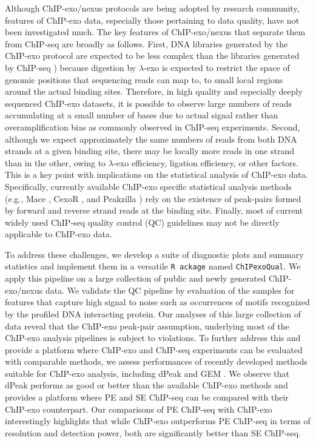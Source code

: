 \documentclass{bmcart}
\newcommand{\pname}[1]{\texttt{ChIPexoQual}}
\begin{document}
Although ChIP-exo/nexus protocols are being adopted by research community, features of ChIP-exo data, especially those pertaining to data quality, have not been investigated much. The key features of ChIP-exo/nexus that separate them from ChIP-seq are broadly as follows. First, DNA libraries generated by the ChIP-exo protocol are expected to be less complex than the libraries generated by ChIP-seq \cite{exo_review}) because digestion by $\lambda$-exo is expected to restrict the space of genomic positions that sequencing reads can map to, to small local regions around the actual binding sites. Therefore, in high quality and especially deeply sequenced ChIP-exo datasets, it is possible to observe large numbers of reads accumulating at a small number of bases due to actual signal rather than overamplification bias as commonly observed in ChIP-seq experiments.  Second, although we expect approximately the same numbers of reads from both DNA strands at a given binding site, there may be locally more reads in one strand than in the other, owing to $\lambda$-exo efficiency, ligation efficiency, or other factors. This is a key point with implications on the statistical analysis of ChIP-exo data. Specifically, currently available ChIP-exo specific statistical analysis methods (e.g., Mace \cite{mace}, CexoR \cite{cexor}, and Peakzilla \cite{peakzilla}) rely on the existence of peak-pairs formed by forward and reverse strand reads at the binding site. Finally, most of current widely used ChIP-seq quality control (QC) guidelines \cite{encode_qc} may not be directly applicable to ChIP-exo data.

To address these challenges, we develop a suite of diagnostic plots and summary statistics and implement them in a versatile \texttt{R ackage} named \pname{}.  We apply this pipeline on a large collection of public and newly generated ChIP-exo/nexus data. We validate the QC pipeline by evaluation of the samples for features that capture high signal to noise such as occurrences of motifs recognized by the profiled DNA interacting protein. Our analyses of this large collection of data reveal that the ChIP-exo peak-pair assumption, underlying most of the ChIP-exo analysis pipelines is subject to violations. To further address this and provide a platform where ChIP-exo and ChIP-seq experiments can be evaluated with comparable methods, we assess performances of recently developed methods suitable for ChIP-exo analysis, including dPeak \cite{dpeak} and GEM \cite{gem}. We observe that dPeak performs as good or better than the available ChIP-exo methods and provides a platform where PE and SE ChIP-seq can be compared with their ChIP-exo counterpart. Our comparisons of PE ChIP-seq with ChIP-exo interestingly highlights that while ChIP-exo outperforms PE ChIP-seq in terms of resolution and detection power, both are significantly better than SE ChIP-seq.
\end{document}
